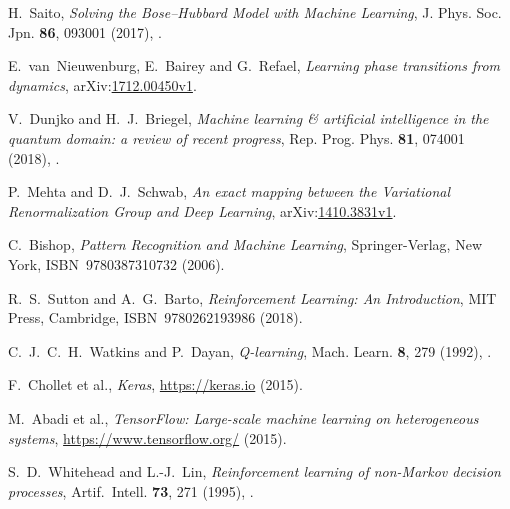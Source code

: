 \documentclass[11pt, a4paper]{report} %
\begin{document}
\begin{thebibliography}{99}
H.~Saito, \textit{Solving the Bose–Hubbard Model with Machine Learning}, J. Phys. Soc. Jpn. \textbf{86}, 093001 (2017), .




E.~van~Nieuwenburg, E.~Bairey and G.~Refael, \textit{Learning phase transitions from dynamics}, arXiv:\href{https://arxiv.org/abs/1712.00450v1}{1712.00450v1}.




V.~Dunjko and H.~J.~Briegel, \textit{Machine learning \& artificial intelligence in the quantum domain: a review of recent progress}, Rep. Prog. Phys. \textbf{81}, 074001 (2018), .



P.~Mehta and D.~J.~Schwab, \textit{An exact mapping between the Variational Renormalization Group and Deep Learning}, arXiv:\href{https://arxiv.org/abs/1410.3831v1}{1410.3831v1}. 




C.~Bishop, \emph{Pattern Recognition and Machine Learning}, Springer-Verlag, New York, ISBN~9780387310732 (2006).


R.~S.~Sutton and A.~G.~Barto, \emph{Reinforcement Learning: An Introduction}, MIT Press, Cambridge, ISBN~9780262193986 (2018).




C.~J.~C.~H.~Watkins and P.~Dayan, \textit{Q-learning}, Mach. Learn. \textbf{8}, 279 (1992), .




F.~Chollet et al., \emph{Keras}, \href{https://keras.io}{https://keras.io} (2015).





M.~Abadi et al., \emph{{TensorFlow}: Large-scale machine learning on heterogeneous systems}, \href{https://www.tensorflow.org/}{https://www.tensorflow.org/} (2015).





S.~D.~Whitehead and L.-J.~Lin, \textit{Reinforcement learning of non-Markov decision processes}, Artif.~Intell. \textbf{73}, 271 (1995), .





\end{thebibliography}
\end{document}

